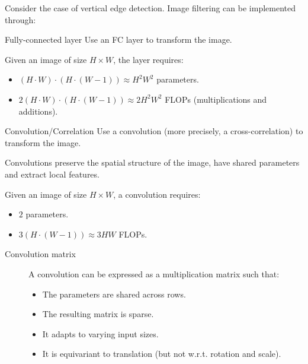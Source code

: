 Consider the case of vertical edge detection.
Image filtering can be implemented through:
\begin{descriptionlist}
    \item[Fully-connected layer] 
        Use an FC layer to transform the image.

        Given an image of size $H \times W$, the layer requires:
        \begin{itemize}
            \item $(H \cdot W) \cdot (H \cdot (W-1)) \approx H^2W^2$ parameters.
            \item $2 (H \cdot W) \cdot (H \cdot (W-1)) \approx 2H^2W^2$ FLOPs (multiplications and additions).
        \end{itemize}

    \item[Convolution/Correlation] 
        Use a convolution (more precisely, a cross-correlation) to transform the image.

        \begin{remark}
            Convolutions preserve the spatial structure of the image, have shared parameters and extract local features.
        \end{remark}

        Given an image of size $H \times W$, a convolution requires:
        \begin{itemize}
            \item $2$ parameters.
            \item $3 (H \cdot (W-1)) \approx 3HW$ FLOPs.
        \end{itemize}

        \begin{description}
            \item[Convolution matrix] 
                A convolution can be expressed as a multiplication matrix such that:
                \begin{itemize}
                    \item The parameters are shared across rows.
                    \item The resulting matrix is sparse.
                    \item It adapts to varying input sizes.
                    \item It is equivariant to translation (but not w.r.t. rotation and scale).
                \end{itemize}


\end{description}
\end{descriptionlist}

